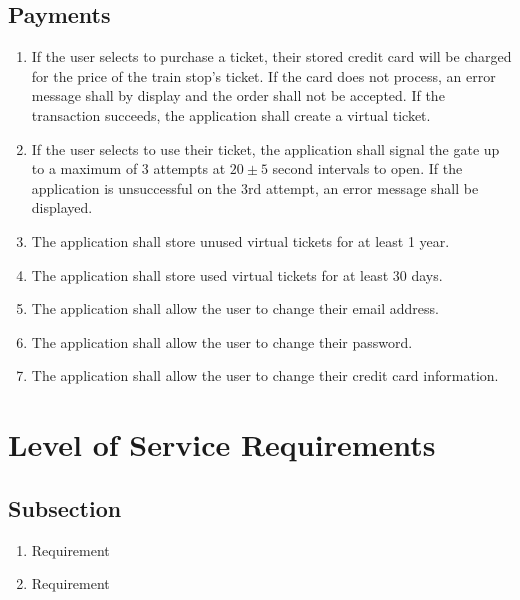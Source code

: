 \documentclass[titlepage]{article}
\begin{document}
	\subsection{Payments}\begin{enumerate}
		\item If the user selects to purchase a ticket, their stored credit card will be charged for the price of the train stop’s ticket. If the card does not process, an error message shall by display and the order shall not be accepted. If the transaction succeeds, the application shall create a virtual ticket.
		\item If the user selects to use their ticket, the application shall signal the gate up to a maximum of 3 attempts at $20\pm 5$ second intervals to open. If the application is unsuccessful on the 3rd attempt, an error message shall be displayed.
		\item The application shall store unused virtual tickets for at least 1 year.
		\item The application shall store used virtual tickets for at least 30 days.
		\item The application shall allow the user to change their email address.
		\item The application shall allow the user to change their password.
		\item The application shall allow the user to change their credit card information.
	\end{enumerate}		
\newpage	
\section{Level of Service Requirements}

	\subsection{Subsection}\begin{enumerate}
		\item Requirement
		\item Requirement
	\end{enumerate}
		
\end{document}
